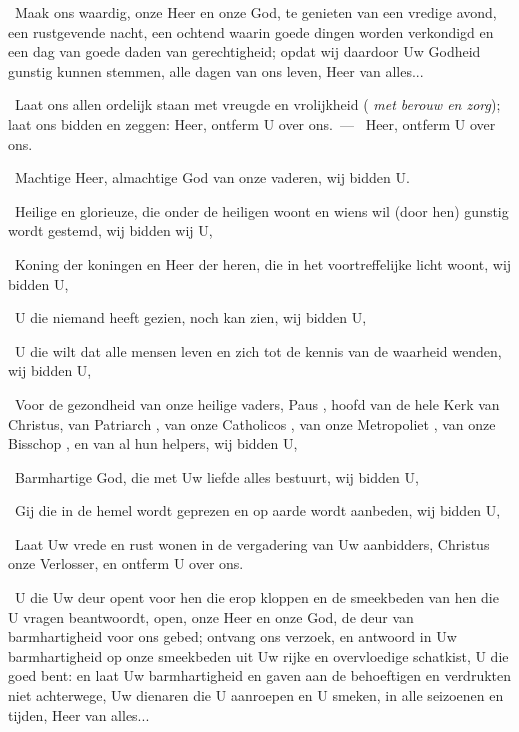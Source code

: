 \documentclass[12pt,twoside,a5paper]{article}
\begin{document}
\begin{halfparskip}\begin{sfpar}
   

  \cc~Maak ons waardig, onze Heer en onze God, te genieten van een vredige avond, een rustgevende nacht, een ochtend waarin goede dingen worden verkondigd en een dag van goede daden van gerechtigheid; opdat wij daardoor Uw Godheid gunstig kunnen stemmen, alle dagen van ons leven, Heer van alles...


  \dd~Laat ons allen ordelijk staan met vreugde en vrolijkheid ( \emph{met berouw en zorg}); laat ons bidden en zeggen: Heer, ontferm U over ons.~--- \rr~Heer, ontferm U over ons. 

  \dd~Machtige Heer, almachtige God van onze vaderen, wij bidden U.

  \dd~Heilige en glorieuze, die onder de heiligen woont en wiens wil (door hen) gunstig wordt gestemd, wij bidden wij U,

  \dd~Koning der koningen en Heer der heren, die in het voortreffelijke licht woont, wij bidden U,

  \dd~U die niemand heeft gezien, noch kan zien, wij bidden U,

  \dd~U die wilt dat alle mensen leven en zich tot de kennis van de waarheid wenden, wij bidden U,

  \dd~Voor de gezondheid van onze heilige vaders, Paus \NN , hoofd van de hele Kerk van Christus, van Patriarch \NN , van onze Catholicos \NN , van onze Metropoliet \NN , van onze Bisschop \NN , en van al hun helpers, wij bidden U,

  \dd~Barmhartige God, die met Uw liefde alles bestuurt, wij bidden U,

  \dd~Gij die in de hemel wordt geprezen en op aarde wordt aanbeden, wij bidden U,

  \dd~Laat Uw vrede en rust wonen in de vergadering van Uw aanbidders, Christus onze Verlosser, en ontferm U over ons.


  \cc~U die Uw deur opent voor hen die erop kloppen en de smeekbeden van hen die U vragen beantwoordt, open, onze Heer en onze God, de deur van barmhartigheid voor ons gebed; ontvang ons verzoek, en antwoord in Uw barmhartigheid op onze smeekbeden uit Uw rijke en overvloedige schatkist, U die goed bent: en laat Uw barmhartigheid en gaven aan de behoeftigen en verdrukten niet achterwege, Uw dienaren die U aanroepen en U smeken, in alle seizoenen en tijden, Heer van alles...


\end{sfpar}
\end{halfparskip}
\end{document}

